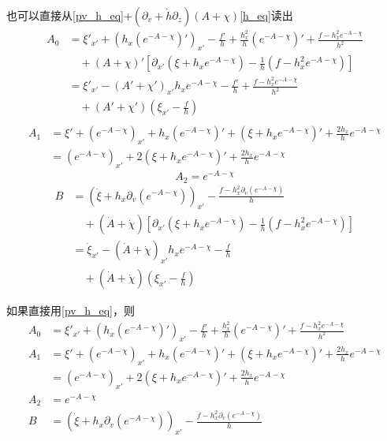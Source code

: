 \documentclass[12pt,a4paper]{ctexart}
\numberwithin{equation}{section}
\begin{document}
也可以直接从\eqref{pv_h_eq}+$(\partial_v+\dot{h}\partial_z)(A+\chi)$\eqref{h_eq}读出
\begin{equation}
    \begin{aligned}
        A_0&=\xi'_{x'}+\left(h_x(e^{-A-\chi})'\right)_{x'}-\frac{f'}{h}+\frac{h_x^2}{h}(e^{-A-\chi})'+\frac{f-h_x^2 e^{-A-\chi}}{h^2}\\
        &\quad+(A+\chi)'[\partial_{x'}(\xi+h_{x}e^{-A-\chi})-\frac{1}{h}(f-h_{x}^{2}e^{-A-\chi})]\\
        &=\xi'_{x'}-(A'+\chi')_{x'}h_x e^{-A-\chi}-\frac{f'}{h}+\frac{f-h_x^2 e^{-A-\chi}}{h^2}\\
        &\quad+(A'+\chi')(\xi_{x'}-\frac{f}{h})\\
    \end{aligned}
\end{equation}
\begin{equation}
    \begin{aligned}
        A_1&=\xi'+(e^{-A-\chi})_{x'}+h_x(e^{-A-\chi})'+(\xi+h_x e^{-A-\chi})'+\frac{2h_x}{h}e^{-A-\chi}\\
        &=(e^{-A-\chi})_{x'}+2(\xi+h_x e^{-A-\chi})'+\frac{2h_x}{h}e^{-A-\chi}
    \end{aligned}
\end{equation}
\begin{equation}
    A_2=e^{-A-\chi}
\end{equation}
\begin{equation}
    \begin{aligned}
        B&=(\dot{\xi}+h_x\partial_v(e^{-A-\chi}))_{x'}-\frac{\dot{f}-h_x^2\partial_v(e^{-A-\chi})}{h}\\
        &\quad+(\dot{A}+\dot{\chi})[\partial_{x'}(\xi+h_{x}e^{-A-\chi})-\frac{1}{h}(f-h_{x}^{2}e^{-A-\chi})]\\
        &=\dot{\xi}_{x'}-(\dot{A}+\dot{\chi})_{x'}h_xe^{-A-\chi}-\frac{\dot{f}}{h}\\
        &\quad+(\dot{A}+\dot{\chi})(\xi_{x'}-\frac{f}{h})
    \end{aligned}
\end{equation}

如果直接用\eqref{pv_h_eq}，则
\begin{equation}
    \begin{aligned}
        A_0&=\xi'_{x'}+\left(h_x(e^{-A-\chi})'\right)_{x'}-\frac{f'}{h}+\frac{h_x^2}{h}(e^{-A-\chi})'+\frac{f-h_x^2 e^{-A-\chi}}{h^2}\\
        A_1&=\xi'+(e^{-A-\chi})_{x'}+h_x(e^{-A-\chi})'+(\xi+h_x e^{-A-\chi})'+\frac{2h_x}{h}e^{-A-\chi}\\
        &=(e^{-A-\chi})_{x'}+2(\xi+h_x e^{-A-\chi})'+\frac{2h_x}{h}e^{-A-\chi}\\
        A_2&=e^{-A-\chi}\\
        B&=(\dot{\xi}+h_x\partial_v(e^{-A-\chi}))_{x'}-\frac{\dot{f}-h_x^2\partial_v(e^{-A-\chi})}{h}
    \end{aligned}
\end{equation}
\end{document}
